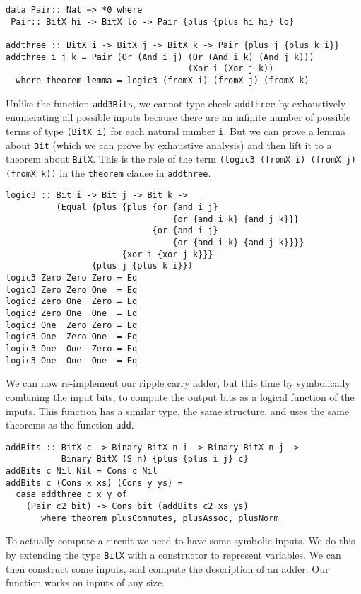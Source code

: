 \documentclass[11pt,twoside,A4]{llncs}
\begin{document}
{\small
\begin{verbatim}
data Pair:: Nat ~> *0 where
 Pair:: BitX hi -> BitX lo -> Pair {plus {plus hi hi} lo}

addthree :: BitX i -> BitX j -> BitX k -> Pair {plus j {plus k i}}
addthree i j k = Pair (Or (And i j) (Or (And i k) (And j k)))
                                    (Xor i (Xor j k))
  where theorem lemma = logic3 (fromX i) (fromX j) (fromX k) 
\end{verbatim}}
Unlike the function \verb+add3Bits+, we cannot type check \verb+addthree+
by exhaustively enumerating all possible inputs because there
are an infinite number of possible terms of type \verb+(BitX i)+ for each
natural number \verb+i+. But we can prove a lemma about \verb+Bit+
(which we can prove by exhaustive analysis) and then lift it to a theorem
about \verb+BitX+. This is the role of the term \verb+(logic3 (fromX i) (fromX j) (fromX k))+
in the \verb+theorem+ clause in \verb+addthree+.

{\small
\begin{verbatim}
logic3 :: Bit i -> Bit j -> Bit k -> 
          (Equal {plus {plus {or {and i j} 
                                 {or {and i k} {and j k}}} 
                             {or {and i j} 
                                 {or {and i k} {and j k}}}} 
                       {xor i {xor j k}}} 
                 {plus j {plus k i}})                                            
logic3 Zero Zero Zero = Eq
logic3 Zero Zero One  = Eq
logic3 Zero One  Zero = Eq
logic3 Zero One  One  = Eq
logic3 One  Zero Zero = Eq
logic3 One  Zero One  = Eq
logic3 One  One  Zero = Eq
logic3 One  One  One  = Eq
\end{verbatim}}
We can now re-implement our ripple carry adder, but this time by
symbolically combining the input bits, to compute
the output bits as a logical function of the inputs. This function
has a similar type, the same structure, and uses the same theorems as the function \verb+add+.

{\small
\begin{verbatim}
addBits :: BitX c -> Binary BitX n i -> Binary BitX n j -> 
           Binary BitX (S n) {plus {plus i j} c}
addBits c Nil Nil = Cons c Nil
addBits c (Cons x xs) (Cons y ys) = 
  case addthree c x y of
    (Pair c2 bit) -> Cons bit (addBits c2 xs ys)
       where theorem plusCommutes, plusAssoc, plusNorm
\end{verbatim}}

To actually compute a circuit we need to have some symbolic inputs. We
do this by extending the type \verb+BitX+ with a constructor to represent variables.
We can then construct some inputs, and compute the description
of an adder. Our function works on inputs of any size.
\end{document}
